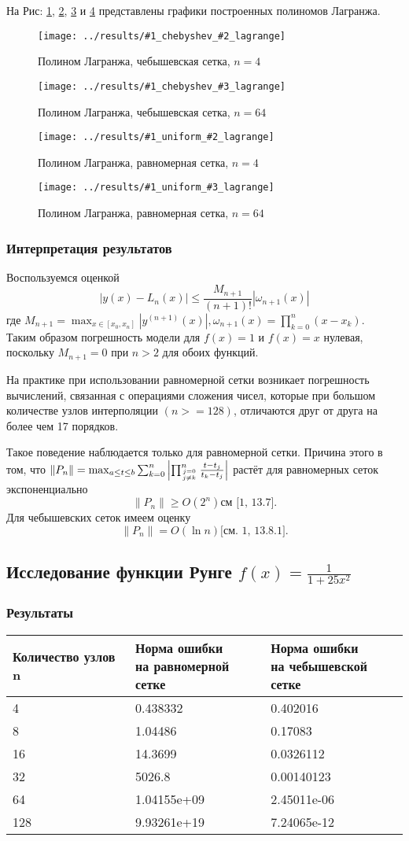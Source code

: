 \documentclass[12pt]{article}
\newcommand{\lagrange}[3] {
	На Рис: \ref{fig:#1chebyshev#2lagrange},  \ref{fig:#1chebyshev#3lagrange}, \ref{fig:#1uniform#2lagrange} и \ref{fig:#1uniform#3lagrange}
	представлены графики построенных полиномов Лагранжа.
	
	\begin{figure}[H]
		\centering
		\texttt{[image: ../results/\#1\_chebyshev\_\#2\_lagrange]}
		\caption{Полином Лагранжа, чебышевская сетка, $n = #2$}
		\label{fig:#1chebyshev#2lagrange}
	\end{figure}
	\begin{figure}[H]
		\centering
		\texttt{[image: ../results/\#1\_chebyshev\_\#3\_lagrange]}
		\caption{Полином Лагранжа, чебышевская сетка, $n = #3$}
		\label{fig:#1chebyshev#3lagrange}
	\end{figure}
	\begin{figure}[H]
		\centering
		\texttt{[image: ../results/\#1\_uniform\_\#2\_lagrange]}
		\caption{Полином Лагранжа, равномерная сетка, $n = #2$}
		\label{fig:#1uniform#2lagrange}
	\end{figure}
	\begin{figure}[H]
		\centering
		\texttt{[image: ../results/\#1\_uniform\_\#3\_lagrange]}
		\caption{Полином Лагранжа, равномерная сетка, $n = #3$}
		\label{fig:#1uniform#3lagrange}
	\end{figure}
}
\begin{document}
\lagrange{linear}{4}{64}

\subsubsection{Интерпретация результатов}
Воспользуемся оценкой 
\begin{equation}
\left|y(x)-L_{n}(x)\right| \leqslant \frac{M_{n+1}}{(n+1) !}\left|\omega_{n+1}(x)\right|
\label{eq:lagest}
\end{equation}
где $M_{n+1}=\max _{x \in\left[x_{0}, x_{n}\right]}\left|y^{(n+1)}(x)\right|, \omega_{n+1}(x)=\prod_{k=0}^{n}\left(x-x_{k}\right)$.\\
Таким образом погрешность модели для $f(x) = 1$ и $f(x) = x$ нулевая, поскольку $M_{n + 1} = 0$ при $n > 2$ для обоих функций.

На практике при использовании равномерной сетки возникает погрешность вычислений, связанная с операциями сложения чисел, которые при большом количестве узлов интерполяции $(n >= 128)$,
отличаются друг от друга на более чем 17 порядков.

Такое поведение наблюдается только для равномерной сетки. Причина этого в том, что $\|P_n\| = \max _{a \leq t \leq b} \sum_{k=0}^{n}\left|\prod_{j=0 \atop j \neq k}^{n} \frac{t-t_{j}}{t_{k}-t_{j}}\right|$ растёт для равномерных сеток экспоненциально 
\begin{equation}
\|P_n\| \geq O(2^n)
\label{eq:uniest}
\text{см [1, 13.7].}
\end{equation} Для чебышевских сеток имеем оценку 
\begin{equation}
\|P_n\| = O(\ln n) 
\text{[см. 1, 13.8.1]}.
\label{eq:cheb}
\end{equation}

\subsection{Исследование функции Рунге $f(x) = \frac{1}{1 + 25x^2}$}
\subsubsection{Результаты}
\begin{tabular}{|l|l|l|}
\hline Количество узлов n & \pbox{20cm}{Норма ошибки\\ на равномерной сетке} & \pbox{20cm}{Норма ошибки\\ на чебышевской сетке} \\ \hline
4 & 0.438332 & 0.402016 \\ \hline
8 & 1.04486 & 0.17083 \\ \hline
16 & 14.3699 & 0.0326112 \\ \hline
32 & 5026.8 & 0.00140123 \\ \hline
64 & 1.04155e+09 & 2.45011e-06 \\ \hline
128 & 9.93261e+19 & 7.24065e-12 \\ \hline
\end{tabular}\\
\end{document}
